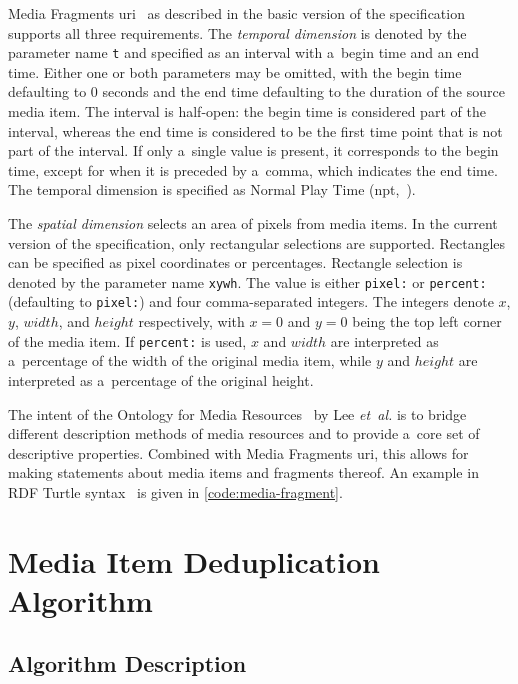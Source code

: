 \documentclass{article}
\begin{document}
Media Fragments {\sc uri}~\cite{troncy2012mediafragments} as described in
the basic version of the specification supports all three requirements.
The \emph{temporal dimension} is denoted by the parameter name \texttt{t}
and specified as an interval with a~begin time and an end time.
Either one or both parameters may be omitted,
with the begin time defaulting to 0 seconds
and the end time defaulting to the duration of the source media item.
The interval is half-open: the begin time is considered part of the interval,
whereas the end time is considered to be the first time point
that is not part of the interval.
If only a~single value is present, it corresponds to the begin time,
except for when it is preceded by a~comma, which indicates the end time.
The temporal dimension is specified as Normal Play Time ({\sc npt},~\cite{schulzrinne1998realtime}).

The \emph{spatial dimension} selects an area of pixels from media items.
In the current version of the specification,
only rectangular selections are supported.
Rectangles can be specified as pixel coordinates or percentages.
Rectangle selection is denoted by the parameter name \texttt{xywh}.
The value is either \texttt{pixel:} or \texttt{percent:}
(defaulting to \texttt{pixel:}) and four comma-separated integers.
The integers denote $ x $, $ y $, $ width $, and $ height $ respectively,
with $ x = 0 $ and $ y = 0 $ being the top left corner of the media item.
If \texttt{percent:} is used,\linebreak
$ x $ and $ width $ are interpreted as a~percentage
of the width of the original media item,
while $ y $ and $ height $ are interpreted as a~percentage
of the original height.

The intent of the Ontology for Media Resources~\cite{lee2012mediaontology}
by Lee \emph{et~al.} is to bridge different description methods of media resources
and to provide a~core set of descriptive properties.
Combined with Media Fragments {\sc uri},
this allows for making statements about media items and fragments thereof.
An example in RDF Turtle syntax~\cite{prudhommeaux2013turtle}
is given in \autoref{code:media-fragment}.

\section{Media Item Deduplication Algorithm}
\label{sec:media-item-deduplication-algorithm}

\subsection{Algorithm Description}
\end{document}
